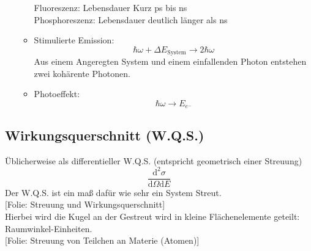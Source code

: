 \documentclass[titlepage,11pt,a4paper,ngerman]{report}
\newcommand{\tx}[1]{\textrm{#1}}
\newcommand{\dd}{\tx{d}}
\newcommand{\folie}[1]{\color{gray}[Folie: #1]\color{black}}
\newcommand{\lcom}[1]{\color{MidnightBlue}#1\color{black}}
\begin{document}
\begin{enumerate}[A)]
\begin{itemize}
\begin{equation*}
		\end{equation*}
		Fluoreszenz: Lebensdauer Kurz ps bis ns \\
		Phosphoreszenz: Lebensdauer deutlich länger als ns \\
		\item Stimulierte Emission:
		\begin{equation*}
		\hbar \omega + \Delta E_{\tx{System}} \rightarrow 2 \hbar \omega
		\end{equation*}
		\lcom{Aus einem Angeregten System und einem einfallenden Photon entstehen zwei kohärente Photonen.}
		\item Photoeffekt:
		\begin{equation*}
		\hbar \omega \rightarrow E_{e^-}
		\end{equation*}
	\end{itemize}
\end{enumerate}

\subsection{Wirkungsquerschnitt (W.Q.S.)}

Üblicherweise als differentieller W.Q.S. (entspricht geometrisch einer Streuung)
\begin{equation*}
\frac{\dd^2 \sigma}{\dd \Omega \dd E}
\end{equation*}
\lcom{Der W.Q.S. ist ein maß dafür wie sehr ein System Streut.}\\
\folie{Streuung und Wirkungsquerschnitt}\\
\lcom{Hierbei wird die Kugel an der Gestreut wird in kleine Flächenelemente geteilt: Raumwinkel-Einheiten.}\\
\folie{Streuung von Teilchen an Materie (Atomen)}
\end{document}
